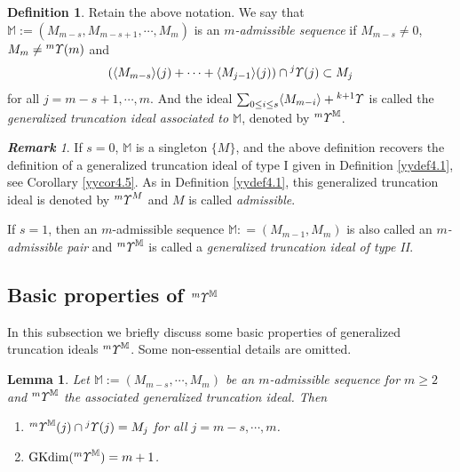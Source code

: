 \documentclass{amsart}
\newtheorem{lem}[thm]{Lemma}
\theoremstyle{definition}
\newtheorem{Def}[thm]{Definition}
\theoremstyle{remark}
\newtheorem{rmk}[thm]{\bf Remark}
\numberwithin{equation}{section}
\newcommand{\lr}[1]{\langle #1 \rangle}
\newcommand{\up}[1]{{^{#1}{\it \!\Upsilon}}}
\newcommand{\upa}[1]{{^{#1}{\it \!\Upsilon}}}
\def\gkdim{\operatorname{GKdim}}
\begin{document}
\begin{Def}
\label{yydef4.10}
Retain the above notation. We say that 
${\mathbb M}:=(M_{m-s}, M_{m-s+1}, \cdots, M_{m})$ is an 
{\it $m$-admissible sequence} if $M_{m-s}\neq 0$, 
$M_{m}\neq \up{m}(m)$ and 
\[(\lr{M_{m-s}}(j)+\cdots+\lr{M_{j-1}}(j))\cap \up{j}(j)
\subset M_j\] 
for all $j=m-s+1, \cdots, m$. And the ideal 
$\sum_{0\le i\le s}\lr{M_{m-i}}+\up{k+1}$ is called the 
{\it generalized truncation ideal associated to 
${\mathbb M}$}, denoted by $\upa{m}^{\mathbb M}$. 
\end{Def}

\begin{rmk}
\label{yyrem4.11}
If $s=0$, ${\mathbb M}$ is a singleton $\{M\}$, and the above 
definition recovers the definition of a generalized truncation 
ideal of type I given in Definition \ref{yydef4.1}, see 
Corollary \ref{yycor4.5}. As in Definition \ref{yydef4.1}, 
this generalized truncation ideal is denoted by $\up{m}^M$ and 
$M$ is called {\it admissible}. 

If $s=1$, then an $m$-admissible sequence ${\mathbb M}:
=(M_{m-1},M_m)$ is also called an {\it $m$-admissible pair} 
and $\up{m}^{\mathbb M}$ is called a {\it generalized 
truncation ideal of type II}.
\end{rmk}


\subsection{Basic properties of $\upa{m}^{\mathbb M}$}
\label{yysec4.5}
In this subsection we briefly discuss some basic properties 
of generalized truncation ideals $\upa{m}^{\mathbb M}$. Some 
non-essential details are omitted.

\begin{lem}
\label{yylem4.12}
Let ${\mathbb M}:=(M_{m-s}, \cdots, M_m)$ be an 
$m$-admissible sequence for $m\ge 2$ and 
$\up{m}^{\mathbb{M}}$ the associated generalized 
truncation ideal. Then
\begin{enumerate}
\item[(1)] 
$\up{m}^{\mathbb{M}}(j)\cap \up{j}(j)=M_j$ for all 
$j=m-s, \cdots, m$.
\item[(2)] 
$\gkdim(\up{m}^\mathbb{M})=m+1$.
\end{enumerate}
\end{lem}
\end{document}
